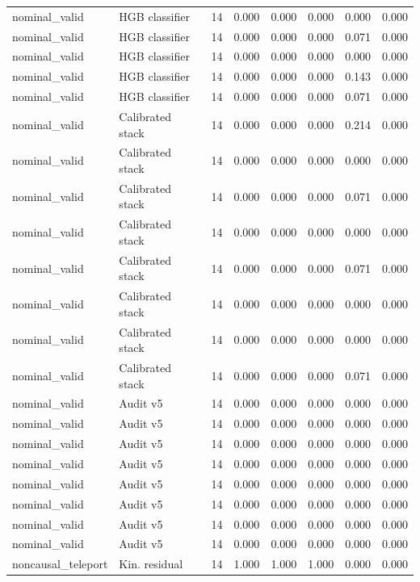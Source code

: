 {\begin{longtable}{llrrrrrr}
nominal\_valid & HGB classifier & 14 & 0.000 & 0.000 & 0.000 & 0.000 & 0.000 \\
nominal\_valid & HGB classifier & 14 & 0.000 & 0.000 & 0.000 & 0.071 & 0.000 \\
nominal\_valid & HGB classifier & 14 & 0.000 & 0.000 & 0.000 & 0.000 & 0.000 \\
nominal\_valid & HGB classifier & 14 & 0.000 & 0.000 & 0.000 & 0.143 & 0.000 \\
nominal\_valid & HGB classifier & 14 & 0.000 & 0.000 & 0.000 & 0.071 & 0.000 \\
nominal\_valid & Calibrated stack & 14 & 0.000 & 0.000 & 0.000 & 0.214 & 0.000 \\
nominal\_valid & Calibrated stack & 14 & 0.000 & 0.000 & 0.000 & 0.000 & 0.000 \\
nominal\_valid & Calibrated stack & 14 & 0.000 & 0.000 & 0.000 & 0.071 & 0.000 \\
nominal\_valid & Calibrated stack & 14 & 0.000 & 0.000 & 0.000 & 0.000 & 0.000 \\
nominal\_valid & Calibrated stack & 14 & 0.000 & 0.000 & 0.000 & 0.071 & 0.000 \\
nominal\_valid & Calibrated stack & 14 & 0.000 & 0.000 & 0.000 & 0.000 & 0.000 \\
nominal\_valid & Calibrated stack & 14 & 0.000 & 0.000 & 0.000 & 0.000 & 0.000 \\
nominal\_valid & Calibrated stack & 14 & 0.000 & 0.000 & 0.000 & 0.071 & 0.000 \\
nominal\_valid & Audit v5 & 14 & 0.000 & 0.000 & 0.000 & 0.000 & 0.000 \\
nominal\_valid & Audit v5 & 14 & 0.000 & 0.000 & 0.000 & 0.000 & 0.000 \\
nominal\_valid & Audit v5 & 14 & 0.000 & 0.000 & 0.000 & 0.000 & 0.000 \\
nominal\_valid & Audit v5 & 14 & 0.000 & 0.000 & 0.000 & 0.000 & 0.000 \\
nominal\_valid & Audit v5 & 14 & 0.000 & 0.000 & 0.000 & 0.000 & 0.000 \\
nominal\_valid & Audit v5 & 14 & 0.000 & 0.000 & 0.000 & 0.000 & 0.000 \\
nominal\_valid & Audit v5 & 14 & 0.000 & 0.000 & 0.000 & 0.000 & 0.000 \\
nominal\_valid & Audit v5 & 14 & 0.000 & 0.000 & 0.000 & 0.000 & 0.000 \\
noncausal\_teleport & Kin. residual & 14 & 1.000 & 1.000 & 1.000 & 0.000 & 0.000 \\

\end{longtable}}

